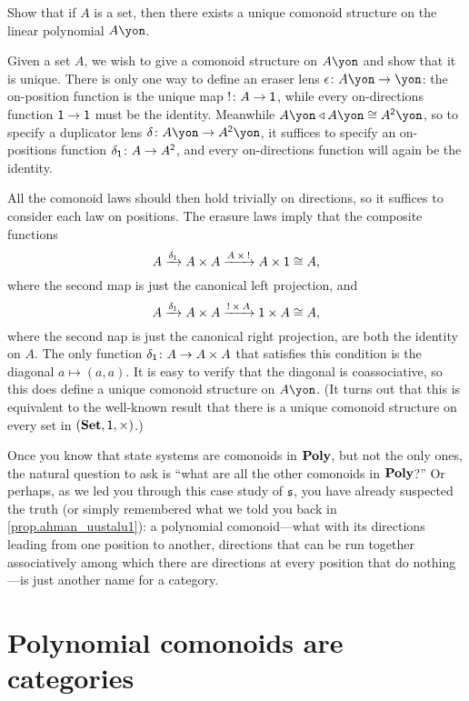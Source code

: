 \documentclass[Book-Poly]{subfiles}
\begin{document}
\begin{exercise}\label{exc.linear_poly_comon}
Show that if $A$ is a set, then there exists a unique comonoid structure on the linear polynomial $A\yon$.
\begin{solution}
Given a set $A$, we wish to give a comonoid structure on $A\yon$ and show that it is unique.
There is only one way to define an eraser lens $\epsilon\colon A\yon\to\yon$: the on-position function is the unique map $!\colon A\to\textsf{1}$, while every on-directions function $\textsf{1}\to\textsf{1}$ must be the identity.
Meanwhile $A\yon\tri A\yon\iso A^\2\yon$, so to specify a duplicator lens $\delta\colon A\yon\to A^\2\yon$, it suffices to specify an on-positions function $\delta_{\textsf{1}}\colon A\to A^{\textsf{2}}$, and every on-directions function will again be the identity.

All the comonoid laws should then hold trivially on directions, so it suffices to consider each law on positions.
The erasure laws imply that the composite functions
\[
    A\xrightarrow{\delta_{\textsf{1}}}A\times A\xrightarrow{A\:\times\:!}A\times\textsf{1}\cong A,
\]
where the second map is just the canonical left projection, and
\[
    A\xrightarrow{\delta_{\textsf{1}}}A\times A\xrightarrow{!\:\times\:A}\textsf{1}\times A\cong A,
\]
where the second nap is just the canonical right projection, are both the identity on $A$.
The only function $\delta_{\textsf{1}}\colon A\to A\times A$ that satisfies this condition is the diagonal $a\mapsto(a,a)$.
It is easy to verify that the diagonal is coassociative, so this does define a unique comonoid structure on $A\yon$.
(It turns out that this is equivalent to the well-known result that there is a unique comonoid structure on every set in $(\mathbf{Set},\textsf{1},\times)$.)
\end{solution}
\end{exercise}

Once you know that state systems are comonoids in $\mathbf{Poly}$, but not the only ones, the natural question to ask is ``what are all the other comonoids in $\mathbf{Poly}$?''
Or perhaps, as we led you through this case study of $\mathfrak{s}$, you have already suspected the truth (or simply remembered what we told you back in \cref{prop.ahman_uustalu1}): a polynomial comonoid---what with its directions leading from one position to another, directions that can be run together associatively among which there are directions at every position that do nothing---is just another name for a category.

\section{Polynomial comonoids are categories}
\end{document}
